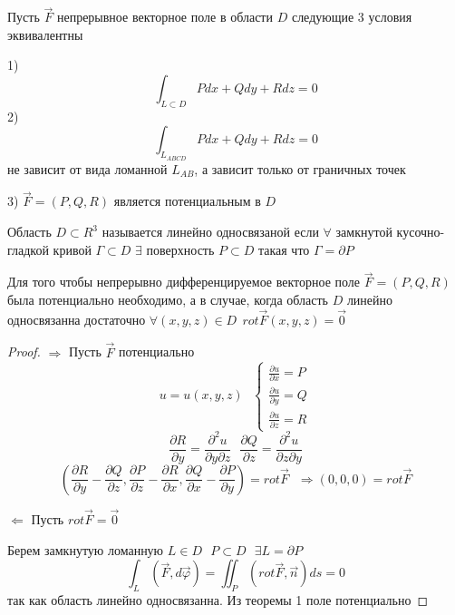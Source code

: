 \begin{theorem}
  Пусть $\vec F$ непрерывное векторное поле в области $D$ следующие 3 условия
  эквивалентны

  1)
  $$
  \int_{L \subset D} Pdx + Qdy + Rdz = 0
  $$
  2)
  $$
  \int_{L_{ABCD}} Pdx + Qdy + Rdz = 0
  $$
  не зависит от вида ломанной $L_{AB}$, а зависит только от граничных точек

  3)
  $\vec F = (P, Q, R)$ является потенциальным в $D$
\end{theorem}

\begin{define}
  Область $D \subset R^3$ называется линейно односвязаной если $\forall$
  замкнутой кусочно-гладкой кривой $\Gamma \subset D$ $\exists$ поверхность
  $P \subset D$ такая что $\Gamma = \partial P$
\end{define}

\begin{block}
  Для того чтобы непрерывно дифференцируемое векторное поле $\vec F = (P, Q, R)$
  была потенциально необходимо, а в случае, когда область $D$ линейно
  односвязанна достаточно $\forall (x,y,z) \in D ~~ rot \vec F(x,y,z) = \vec 0$
\end{block}

\begin{proof}
  $\Rightarrow$ Пусть $\vec F$ потенциально
  $$
  u = u(x,y,z) ~~~
  \left\{
  \begin{array}{l}
    \frac{\partial u}{\partial x} = P \\
    \frac{\partial u}{\partial y} = Q \\
    \frac{\partial u}{\partial z} = R
  \end{array}
  \right.
  $$
  $$
  \frac{\partial R}{\partial y}
  =
  \frac{\partial^2 u}{\partial y \partial z}
  ~~~
  \frac{\partial Q}{\partial z}
  =
  \frac{\partial^2 u}{\partial z \partial y}
  $$
  $$
  \left(
    \frac{\partial R}{\partial y}
    -
    \frac{\partial Q}{\partial z}
    ,
    \frac{\partial P}{\partial z}
    -
    \frac{\partial R}{\partial x}
    ,
    \frac{\partial Q}{\partial x}
    -
    \frac{\partial P}{\partial y}
  \right)
  = rot \vec F
  ~~~
  \Rightarrow (0, 0, 0) = rot \vec F
  $$

  $\Leftarrow$ Пусть $rot \vec F = \vec 0$

  Берем замкнутую ломанную $L \in D ~~~ P \subset D ~~~ \exists L = \partial P$
  $$
  \int_L (\vec F, d \vec \varphi) = \iint_P (rot \vec F, \vec n) ds = 0
  $$
  так как область линейно односвязанна. Из теоремы 1 поле потенциально
\end{proof}
